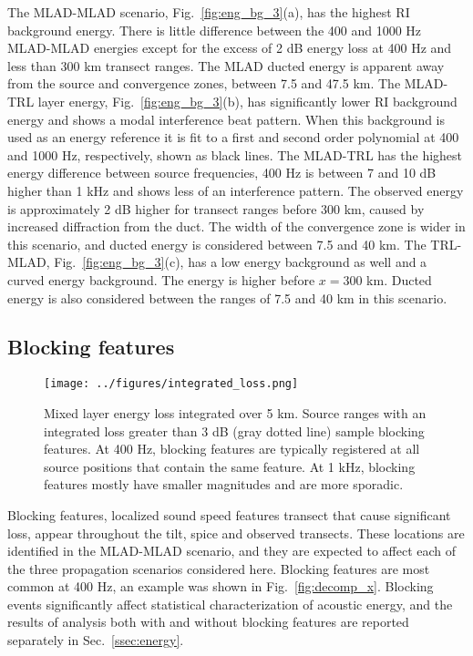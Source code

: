 \documentclass[preprint,NumberedRefs]{JASA}
\begin{document}
The MLAD-MLAD scenario, Fig.~\ref{fig:eng_bg_3}(a), has the highest RI background energy. There is little difference between the 400 and 1000 Hz MLAD-MLAD energies except for the excess of 2 dB energy loss at 400 Hz and less than 300 km transect ranges. The MLAD ducted energy is apparent away from the source and convergence zones, between 7.5 and 47.5 km. The MLAD-TRL layer energy, Fig.~\ref{fig:eng_bg_3}(b), has significantly lower RI background energy and shows a modal interference beat pattern. When this background is used as an energy reference it is fit to a first and second order polynomial at 400 and 1000 Hz, respectively, shown as black lines. The MLAD-TRL has the highest energy difference between source frequencies, 400 Hz is between 7 and 10 dB higher than 1 kHz and shows less of an interference pattern. The observed energy is approximately 2 dB higher for transect ranges before 300 km, caused by increased diffraction from the duct. The width of the convergence zone is wider in this scenario, and ducted energy is considered between 7.5 and 40 km. The TRL-MLAD, Fig.~\ref{fig:eng_bg_3}(c), has a low energy background as well and a curved energy background. The energy is higher before $x=300$ km. Ducted energy is also considered between the ranges of 7.5 and 40 km in this scenario.

\subsection{Blocking features}\label{ssec:blocking}
\begin{figure}
\texttt{[image: ../figures/integrated\_loss.png]}
    \caption{Mixed layer energy loss integrated over 5 km. Source ranges with an integrated loss greater than 3 dB (gray dotted line) sample blocking features. At 400 Hz, blocking features are typically registered at all source positions that contain the same feature. At 1 kHz, blocking features mostly have smaller magnitudes and are more sporadic.}
    \label{fig:blocking}
\end{figure}

Blocking features, localized sound speed features transect that cause significant loss, appear throughout the tilt, spice and observed transects. These locations are identified in the MLAD-MLAD scenario, and they are expected to affect each of the three propagation scenarios considered here. Blocking features are most common at 400 Hz, an example was shown in Fig.~\ref{fig:decomp_x}. Blocking events significantly affect statistical characterization of acoustic energy, and the results of analysis both with and without blocking features are reported separately in Sec.~\ref{ssec:energy}.
\end{document}
